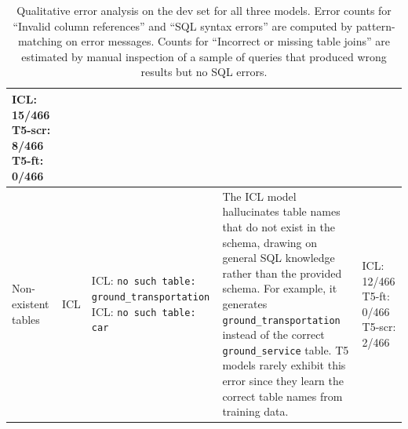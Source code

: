 \documentclass{article}
\begin{document}
\begin{landscape}
\begin{table}
\begin{tabular}{p{2.2cm}p{2cm}p{5.5cm}p{5.5cm}p{5.5cm}}
    ICL: 15/466 \newline
    T5-scr: 8/466 \newline
    T5-ft: 0/466 \\
    \midrule
    Non-existent tables & ICL &
    ICL: \texttt{no such table: ground\_transportation} \newline
    ICL: \texttt{no such table: car} &
    The ICL model hallucinates table names that do not exist in the schema, drawing on general SQL knowledge rather than the provided schema. For example, it generates \texttt{ground\_transportation} instead of the correct \texttt{ground\_service} table. T5 models rarely exhibit this error since they learn the correct table names from training data. &
    ICL: 12/466 \newline
    T5-ft: 0/466 \newline
    T5-scr: 2/466 \\
    \bottomrule
  \end{tabular}
  \caption{Qualitative error analysis on the dev set for all three models. Error counts for ``Invalid column references'' and ``SQL syntax errors'' are computed by pattern-matching on error messages. Counts for ``Incorrect or missing table joins'' are estimated by manual inspection of a sample of queries that produced wrong results but no SQL errors.}
  \label{tab:qualitative}
\end{table}
\end{landscape}
\end{document}
